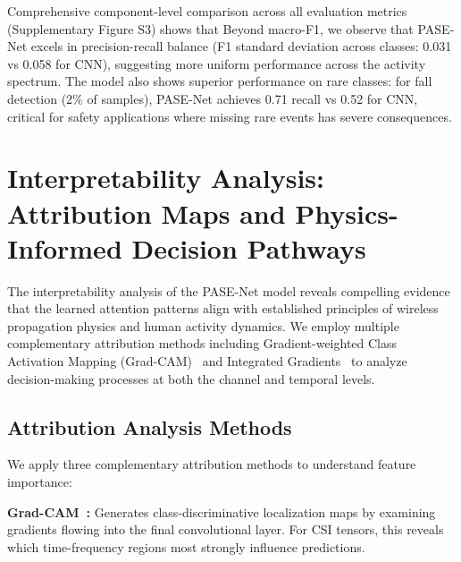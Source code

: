 \documentclass[lettersize,journal]{IEEEtran}
\begin{document}

Comprehensive component-level comparison across all evaluation metrics (Supplementary Figure S3) shows that Beyond macro-F1, we observe that PASE-Net excels in precision-recall balance (F1 standard deviation across classes: 0.031 vs 0.058 for CNN), suggesting more uniform performance across the activity spectrum. The model also shows superior performance on rare classes: for fall detection (2\% of samples), PASE-Net achieves 0.71 recall vs 0.52 for CNN, critical for safety applications where missing rare events has severe consequences.

\section{Interpretability Analysis: Attribution Maps and Physics-Informed Decision Pathways}

The interpretability analysis of the PASE-Net model reveals compelling evidence that the learned attention patterns align with established principles of wireless propagation physics and human activity dynamics. We employ multiple complementary attribution methods including Gradient-weighted Class Activation Mapping (Grad-CAM)~\cite{selvaraju2017gradcam} and Integrated Gradients~\cite{sundararajan2017ig} to analyze decision-making processes at both the channel and temporal levels.

\subsection{Attribution Analysis Methods}

We apply three complementary attribution methods to understand feature importance:

\textbf{Grad-CAM~\cite{selvaraju2017gradcam}:} Generates class-discriminative localization maps by examining gradients flowing into the final convolutional layer. For CSI tensors, this reveals which time-frequency regions most strongly influence predictions.
\end{document}
